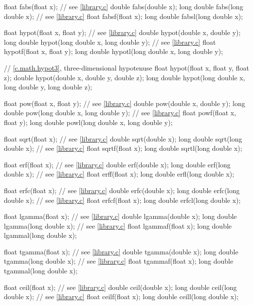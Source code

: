 \begin{codeblock}
{  float fabs(float x);                  // see \ref{library.c}
  double fabs(double x);
  long double fabs(long double x);      // see \ref{library.c}
  float fabsf(float x);
  long double fabsl(long double x);

  float hypot(float x, float y);        // see \ref{library.c}
  double hypot(double x, double y);
  long double hypot(long double x, long double y);  // see \ref{library.c}
  float hypotf(float x, float y);
  long double hypotl(long double x, long double y);

  // \ref{c.math.hypot3}, three-dimensional hypotenuse
  float hypot(float x, float y, float z);
  double hypot(double x, double y, double z);
  long double hypot(long double x, long double y, long double z);

  float pow(float x, float y);          // see \ref{library.c}
  double pow(double x, double y);
  long double pow(long double x, long double y);    // see \ref{library.c}
  float powf(float x, float y);
  long double powl(long double x, long double y);

  float sqrt(float x);                  // see \ref{library.c}
  double sqrt(double x);
  long double sqrt(long double x);      // see \ref{library.c}
  float sqrtf(float x);
  long double sqrtl(long double x);

  float erf(float x);                   // see \ref{library.c}
  double erf(double x);
  long double erf(long double x);       // see \ref{library.c}
  float erff(float x);
  long double erfl(long double x);

  float erfc(float x);                  // see \ref{library.c}
  double erfc(double x);
  long double erfc(long double x);      // see \ref{library.c}
  float erfcf(float x);
  long double erfcl(long double x);

  float lgamma(float x);                // see \ref{library.c}
  double lgamma(double x);
  long double lgamma(long double x);    // see \ref{library.c}
  float lgammaf(float x);
  long double lgammal(long double x);

  float tgamma(float x);                // see \ref{library.c}
  double tgamma(double x);
  long double tgamma(long double x);    // see \ref{library.c}
  float tgammaf(float x);
  long double tgammal(long double x);

  float ceil(float x);                  // see \ref{library.c}
  double ceil(double x);
  long double ceil(long double x);      // see \ref{library.c}
  float ceilf(float x);
  long double ceill(long double x);

}
\end{codeblock}
